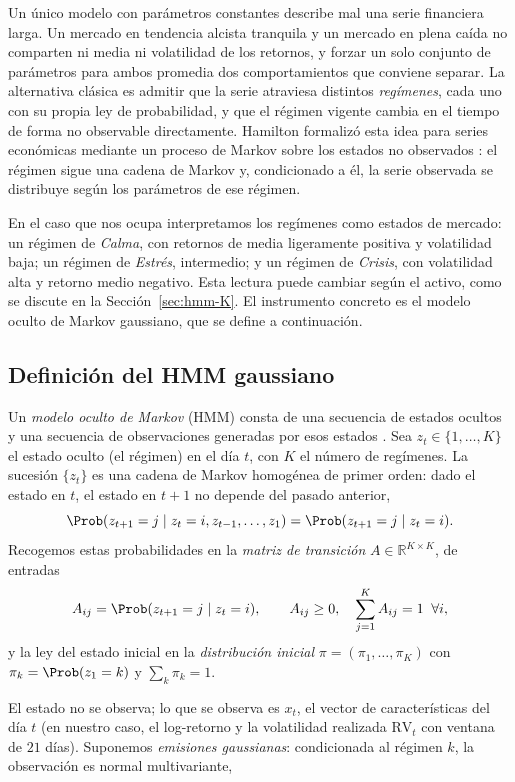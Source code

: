 Un único modelo con parámetros constantes describe mal una serie financiera larga. Un mercado en tendencia alcista tranquila y un mercado en plena caída no comparten ni media ni volatilidad de los retornos, y forzar un solo conjunto de parámetros para ambos promedia dos comportamientos que conviene separar. La alternativa clásica es admitir que la serie atraviesa distintos \emph{regímenes}, cada uno con su propia ley de probabilidad, y que el régimen vigente cambia en el tiempo de forma no observable directamente. Hamilton formalizó esta idea para series económicas mediante un proceso de Markov sobre los estados no observados \cite{hamilton1989}: el régimen sigue una cadena de Markov y, condicionado a él, la serie observada se distribuye según los parámetros de ese régimen.

En el caso que nos ocupa interpretamos los regímenes como estados de mercado: un régimen de \emph{Calma}, con retornos de media ligeramente positiva y volatilidad baja; un régimen de \emph{Estrés}, intermedio; y un régimen de \emph{Crisis}, con volatilidad alta y retorno medio negativo. Esta lectura puede cambiar según el activo, como se discute en la Sección~\ref{sec:hmm-K}. El instrumento concreto es el modelo oculto de Markov gaussiano, que se define a continuación.

\subsection{Definición del HMM gaussiano}
\label{sec:hmm-def}

Un \emph{modelo oculto de Markov} (HMM) consta de una secuencia de estados ocultos y una secuencia de observaciones generadas por esos estados \cite{rabiner1989, cappe2005}. Sea $z_t \in \{1, \dots, K\}$ el estado oculto (el régimen) en el día $t$, con $K$ el número de regímenes. La sucesión $\{z_t\}$ es una cadena de Markov homogénea de primer orden: dado el estado en $t$, el estado en $t+1$ no depende del pasado anterior,
\[
\Prob(z_{t+1} = j \mid z_t = i, z_{t-1}, \dots, z_1) = \Prob(z_{t+1} = j \mid z_t = i).
\]
Recogemos estas probabilidades en la \emph{matriz de transición} $A \in \mathbb{R}^{K \times K}$, de entradas
\[
A_{ij} = \Prob(z_{t+1} = j \mid z_t = i), \qquad A_{ij} \ge 0, \quad \sum_{j=1}^{K} A_{ij} = 1 \;\;\forall i,
\]
y la ley del estado inicial en la \emph{distribución inicial} $\pi = (\pi_1, \dots, \pi_K)$ con $\pi_k = \Prob(z_1 = k)$ y $\sum_k \pi_k = 1$.

El estado no se observa; lo que se observa es $x_t$, el vector de características del día $t$ (en nuestro caso, el log-retorno y la volatilidad realizada $\mathrm{RV}_t$ con ventana de $21$ días). Suponemos \emph{emisiones gaussianas}: condicionada al régimen $k$, la observación es normal multivariante,

